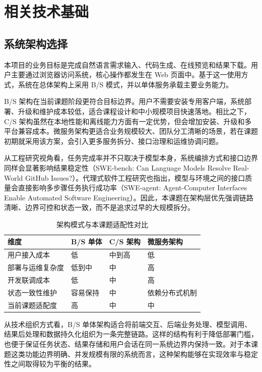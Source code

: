 \chapter{相关技术基础}

\section{系统架构选择}
本项目的业务目标是完成自然语言需求输入、代码生成、在线预览和结果下载。用户主要通过浏览器访问系统，核心操作都发生在 Web 页面中。基于这一使用方式，系统在总体架构上采用 B/S 模式，并以单体服务承载主要业务能力。

B/S 架构在当前课题阶段更符合目标边界。用户不需要安装专用客户端，系统部署、升级和维护成本较低，适合课程设计和中小规模项目快速落地。相比之下，C/S 架构虽然在本地性能和离线能力方面有一定优势，但会增加安装、升级和多平台兼容成本。微服务架构更适合业务规模较大、团队分工清晰的场景，若在课题初期就采用该方案，会引入更多服务拆分、接口治理和运维协调问题。

从工程研究视角看，任务完成率并不只取决于模型本身，系统编排方式和接口边界同样会显著影响结果稳定性（SWE-bench: Can Language Models Resolve Real-World GitHub Issues?）\cite{jimenez2024swebench}。代理式软件工程研究也指出，模型与环境之间的接口质量会直接影响多步骤任务执行成功率（SWE-agent: Agent-Computer Interfaces Enable Automated Software Engineering）\cite{yang2024sweagent}。因此，本课题在架构层优先强调链路清晰、边界可控和状态一致，而不是追求过早的大规模拆分。

\begin{table}[htbp]
\centering
\caption{架构模式与本课题适配性对比}
\label{tab:chapter2-arch-compare}
\small
\begin{tabular}{@{}p{}p{}p{}p{}@{}}
\toprule
维度 & B/S 单体 & C/S 架构 & 微服务架构 \\
\midrule
用户接入成本 & 低 & 中到高 & 低 \\
部署与运维复杂度 & 低到中 & 中 & 高 \\
开发联调成本 & 低 & 中 & 高 \\
状态一致性维护 & 容易保持 & 中 & 依赖分布式机制 \\
当前课题适配度 & 高 & 中 & 中 \\
\bottomrule
\end{tabular}
\end{table}

从技术组织方式看，B/S 单体架构适合将前端交互、后端业务处理、模型调用、结果后处理和数据持久化组织为一条完整链路。这样的结构有利于降低部署门槛，也便于保证任务状态、结果存储和用户会话在同一系统边界内保持一致。对于本课题这类功能边界明确、并发规模有限的系统而言，这种架构能够在实现效率与稳定性之间取得较为平衡的结果。

